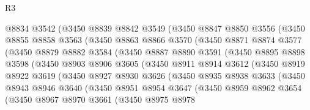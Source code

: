 \begin{lexlean}{R3}
\begin{coremodule}
            @8834
            @3542
            (@3450
              @8839
              @8842
              @3549
              (@3450
                @8847
                @8850
                @3556
                (@3450
                  @8855
                  @8858
                  @3563
                  (@3450
                    @8863
                    @8866
                    @3570
                    (@3450
                      @8871
                      @8874
                      @3577
                      (@3450
                        @8879
                        @8882
                        @3584
                        (@3450
                          @8887
                          @8890
                          @3591
                          (@3450
                            @8895
                            @8898
                            @3598
                            (@3450
                              @8903
                              @8906
                              @3605
                              (@3450
                                @8911
                                @8914
                                @3612
                                (@3450
                                  @8919
                                  @8922
                                  @3619
                                  (@3450
                                    @8927
                                    @8930
                                    @3626
                                    (@3450
                                      @8935
                                      @8938
                                      @3633
                                      (@3450
                                        @8943
                                        @8946
                                        @3640
                                        (@3450
                                          @8951
                                          @8954
                                          @3647
                                          (@3450
                                            @8959
                                            @8962
                                            @3654
                                            (@3450
                                              @8967
                                              @8970
                                              @3661
                                              (@3450
                                                @8975
                                                @8978

\end{coremodule}
\end{lexlean}
